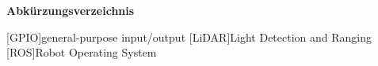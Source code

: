 \Huge\bf Abkürzungsverzeichnis \\
\normalsize\rm

\begin{acronym}

[GPIO]{general-purpose input/output}
[LiDAR]{Light Detection and Ranging}
[ROS]{Robot Operating System}
    
\end{acronym}

\newpage